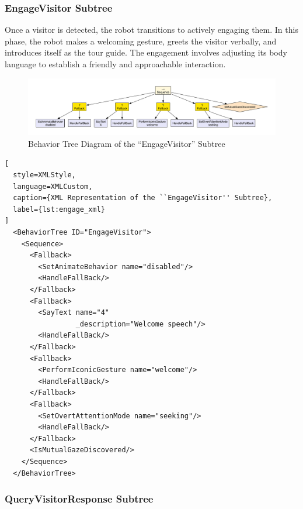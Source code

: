 \documentclass{CSSRforAfrica}
\begin{document}
\subsubsection{EngageVisitor Subtree}

Once a visitor is detected, the robot transitions to actively engaging them. In this phase, the robot makes a welcoming gesture, greets the visitor verbally, and introduces itself as the tour guide. The engagement involves adjusting its body language to establish a friendly and approachable interaction.
\begin{landscape}
\begin{figure}[H]
  \vspace{3cm}
  \centering
  \includegraphics[width=1.1\linewidth]{./diagrams/engage.pdf}
  \caption{Behavior Tree Diagram of the ``EngageVisitor'' Subtree}
  \label{fig:engage_diagram}
\end{figure}
\end{landscape}

\begin{lstlisting}[
  style=XMLStyle, 
  language=XMLCustom, 
  caption={XML Representation of the ``EngageVisitor'' Subtree},
  label={lst:engage_xml}
]
  <BehaviorTree ID="EngageVisitor">
    <Sequence>
      <Fallback>
        <SetAnimateBehavior name="disabled"/>
        <HandleFallBack/>
      </Fallback>
      <Fallback>
        <SayText name="4"
                 _description="Welcome speech"/>
        <HandleFallBack/>
      </Fallback>
      <Fallback>
        <PerformIconicGesture name="welcome"/>
        <HandleFallBack/>
      </Fallback>
      <Fallback>
        <SetOvertAttentionMode name="seeking"/>
        <HandleFallBack/>
      </Fallback>
      <IsMutualGazeDiscovered/>
    </Sequence>
  </BehaviorTree>
\end{lstlisting}



\newpage

\subsubsection{QueryVisitorResponse Subtree}
 
\end{document}
